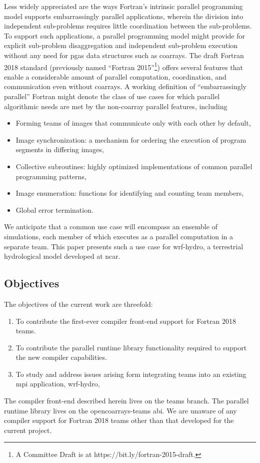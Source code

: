 Less widely appreciated are the ways Fortran's intrinsic parallel programming model supports embarrassingly
parallel applications, wherein the division into independent sub-problems requires little coordination between
the sub-problems. To support such applications, a parallel programming
model might provide for explicit sub-problem disaggregation and independent sub-problem execution without any need for
\gls{pgas} data structures such as \glspl{coarray}.  The draft Fortran 2018 standard
(previously named ``Fortran 2015''\footnote{A Committee Draft is at https://bit.ly/fortran-2015-draft.}) offers several
features that enable a considerable amount of parallel computation, coordination, and communication
even without \glspl{coarray}.  A working definition of ``embarrassingly parallel'' Fortran might denote the class of
use cases for which parallel algorithmic needs are met by the non-\gls{coarray} parallel features, including
\begin{itemize}
   \item Forming teams of images that communicate only with each other by default,
   \item Image synchronization: a mechanism for ordering the execution of program segments in differing images,
   \item Collective subroutines: highly optimized implementations of common parallel programming patterns,
   \item Image enumeration: functions for identifying and counting team members,
   \item Global error termination.
\end{itemize}
We anticipate that a common use case will encompass an ensemble of simulations, each member of
which executes as a parallel computation in a separate team.  This paper presents such a use case for
\gls{wrf-hydro}, a terrestrial hydrological model developed at \gls{ncar}.

\subsection{Objectives}\label{sec:objectives}
The objectives of the current work are threefold:
\begin{enumerate}
  \item To contribute the first-ever compiler front-end support for Fortran 2018 teams.
  \item To contribute the parallel runtime library functionality required to support the new compiler capabilities.
  \item To study and address issues arising form integrating teams into an existing \gls{mpi} application, \gls{wrf-hydro},
\end{enumerate}
The compiler front-end described herein lives on the
 teams branch. The parallel runtime library lives
on the  opencoarrays-teams
\gls{abi}.  We are unaware of any compiler support for Fortran 2018 teams other than that developed for the current
project.


